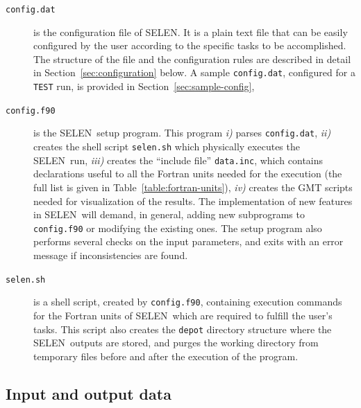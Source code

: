 \documentclass[11pt,fleqn,a4paper,titlepage]{article}
\newcommand\selen{\textsf{SELEN~}}
\newcommand\selens{\textsf{SELEN}}
\begin{document}
{\begin{description}
\item [\texttt{config.dat}] is the configuration file of \selens. It is a plain text file that can 
be easily configured by the user according to the specific tasks to be accomplished. The structure of the file and the configuration rules are described in detail in Section~\ref{sec:configuration} below. A sample {\texttt{config.dat}}, configured for a \texttt{TEST} run, is provided in Section~\ref{sec:sample-config}, 
\item [{\texttt{config.f90}}] is the \selen setup program. This program \textit{i)} 
parses {\texttt{config.dat}}, \textit{ii)} creates the shell script  \texttt{selen.sh} which physically executes the \selen run, 
\textit{iii)} creates  the ``include file'' \texttt{data.inc}, which contains declarations useful to all the Fortran units needed
for the execution (the full list is given in 
Table~\ref{table:fortran-units}), \textit{iv)} creates the GMT scripts needed for visualization of the results. The implementation of new features in \selen will demand, in general, adding new subprograms to {\texttt{config.f90}} or modifying the existing ones.   The setup program also performs several checks on the input parameters, and exits with an error message if inconsistencies are found. 
\item [\texttt{selen.sh}] is a shell script, created by {\texttt{config.f90}}, containing execution commands for the Fortran units of \selen which are required to fulfill the user's tasks. 
This script also creates the \texttt{depot} directory structure where
the \selen outputs are stored, and purges the working directory from temporary files before and after the execution of the program.
\end{description}

\subsection{Input and output data}\label{sec:input-output}
}
\end{document}
